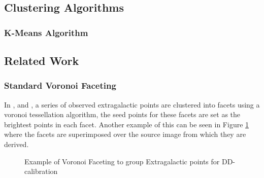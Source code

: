 \subsection{Clustering Algorithms} \label{tes:sec:clu}
%
\subsubsection{K-Means Algorithm}\label{tes:ssec:kma}
\subsection{Related Work}\label{ra:sec:rw}
%
\subsubsection{Standard Voronoi Faceting}\label{ra:ssec:svf}
In \cite{tasse2014applying}, \cite{smirnov2015radio} and \cite{van2016lofar}, a series of observed extragalactic points are clustered into facets using a voronoi tessellation algorithm, the seed points for these facets are set as the brightest points in each facet. Another example of this can be seen in Figure \ref{tes:fig:stelvor} where the facets are superimposed over the source image from which they are derived.
%
\begin{figure}[H]
    \centering
    \caption{Example of Voronoi Faceting to group Extragalactic points for DD-calibration \citep{oleg}}
    \label{tes:fig:stelvor}
\end{figure}
